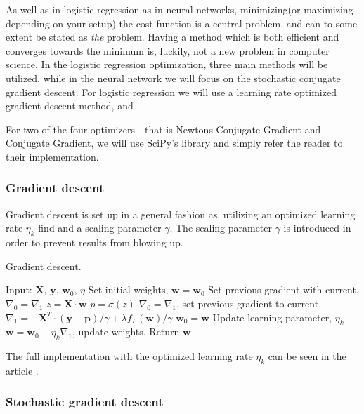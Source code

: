 As well as in logistic regression as in neural networks, minimizing(or maximizing depending on your setup) the cost function is a central problem, and can to some extent be stated as \textit{the} problem. Having a method which is both efficient and converges towards the minimum is, luckily, not a new problem in computer science. In the logistic regression optimization, three main methods will be utilized, while in the neural network we will focus on the stochastic conjugate gradient descent. For logistic regression we will use a learning rate optimized gradient descent method, and 

For two of the four optimizers - that is Newtons Conjugate Gradient\cite{} and Conjugate Gradient\cite{Press:2007:NRE:1403886}, we will use SciPy's library\cite{scipy} and simply refer the reader to their implementation.

\subsubsection{Gradient descent}
Gradient descent is set up in a general fashion as, utilizing an optimized learning rate $\eta_k$ find and a scaling parameter $\gamma$. The scaling parameter $\gamma$ is introduced in order to prevent results from blowing up.
\begin{algorithm}[H]
    \caption{Gradient descent.}
    \label{alg:gd}
    \begin{algorithmic}[1]
        \State Input: $\bm{X}$, $\bm{y}$, $\bm{w}_0$, $\eta$
        \State Set initial weights, $\bm{w} = \bm{w}_0$
        \State Set previous gradient with current, $\nabla_0 = \nabla_1$
            \State $z = \bm{X}\cdot \bm{w}$
            \State $p = \sigma(z)$
            \State $\nabla_0 = \nabla_1$, set previous gradient to current.
            \State $\nabla_1 = - \bm{X}^T \cdot (\bm{y} - \bm{p}) / \gamma + \lambda f_L(\bm{w}) / \gamma$
            \State $\bm{w}_0 = \bm{w}$
            \State Update learning parameter, $\eta_k$
            \State $\bm{w} = \bm{w}_0 - \eta_k \nabla_1$, update weights.
        \EndWhile
        \State Return $\bm{w}$
    \end{algorithmic}
\end{algorithm}
The full implementation with the optimized learning rate $\eta_k$ can be seen in the article \citet{optimal-learning-rate}.

\subsubsection{Stochastic gradient descent}


